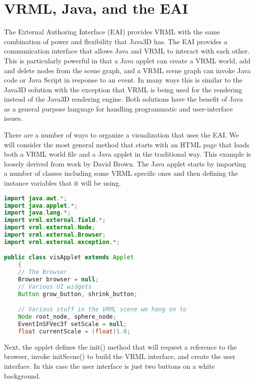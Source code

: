 \section{VRML, Java, and the EAI}

The External Authoring Interface (EAI) provides VRML with the same combination of power and flexibility that Java3D has. The EAI provides a communication interface that allows Java and VRML to interact with each other. This is particularly powerful in that a Java applet can create a VRML world, add and delete nodes from the scene graph, and a VRML scene graph can invoke Java code or Java Script in response to an event. In many ways this is similar to the Java3D solution with the exception that VRML is being used for the rendering instead of the Java3D rendering engine. Both solutions have the benefit of Java as a general purpose language for handling programmatic and user-interface issues.

There are a number of ways to organize a visualization that uses the EAI. We will consider the most general method that starts with an HTML page that loads both a VRML world file and a Java applet in the traditional way. This example is loosely derived from work by David Brown. The Java applet starts by importing a number of classes including some VRML specific ones and then defining the instance variables that it will be using.

\begin{lstlisting}[language=Java, caption={}, numbers=none, frame=none]
import java.awt.*;
import java.applet.*;
import java.lang.*;
import vrml.external.field.*;
import vrml.external.Node;
import vrml.external.Browser;
import vrml.external.exception.*;

public class visApplet extends Applet
    {
    // The Browser
    Browser browser = null;
    // Various UI widgets
    Button grow_button, shrink_button;

    // Various stuff in the VRML scene we hang on to
    Node root_node, sphere_node;
    EventInSFVec3f setScale = null;
    float currentScale = (float)1.0;
\end{lstlisting}

Next, the applet defines the init() method that will request a reference to the browser, invoke initScene() to build the VRML interface, and create the user interface. In this case the user interface is just two buttons on a white background.

